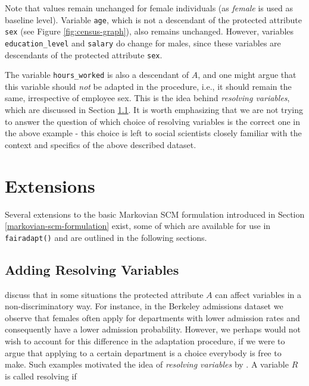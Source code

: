 \documentclass[
  nojss]{jss}
\begin{document}
Note that values remain unchanged for female individuals (as
\emph{female} is used as baseline level). Variable \texttt{age}, which
is not a descendant of the protected attribute \texttt{sex} (see Figure
\ref{fig:census-graph}), also remains unchanged. However, variables
\texttt{education\_level} and \texttt{salary} do change for males, since
these variables are descendants of the protected attribute \texttt{sex}.

The variable \texttt{hours\_worked} is also a descendant of \(A\), and
one might argue that this variable should \emph{not} be adapted in the
procedure, i.e., it should remain the same, irrespective of employee
sex. This is the idea behind \emph{resolving variables}, which are
discussed in Section \ref{sec:resolvers}. It is worth emphasizing that
we are not trying to answer the question of which choice of resolving
variables is the correct one in the above example - this choice is left
to social scientists closely familiar with the context and specifics of
the above described dataset.

\hypertarget{sec:extensions}{%
\section{Extensions}\label{sec:extensions}}

Several extensions to the basic Markovian SCM formulation introduced in
Section \ref{markovian-scm-formulation} exist, some of which are
available for use in \texttt{fairadapt()} and are outlined in the
following sections.

\hypertarget{sec:resolvers}{%
\subsection{Adding Resolving Variables}\label{sec:resolvers}}

\cite{kilbertus2017avoiding} discuss that in some situations the
protected attribute \(A\) can affect variables in a non-discriminatory
way. For instance, in the Berkeley admissions dataset
\citep{bickel1975sex} we observe that females often apply for
departments with lower admission rates and consequently have a lower
admission probability. However, we perhaps would not wish to account for
this difference in the adaptation procedure, if we were to argue that
applying to a certain department is a choice everybody is free to make.
Such examples motivated the idea of \emph{resolving variables} by
\citet{kilbertus2017avoiding}. A variable \(R\) is called resolving if
\end{document}
